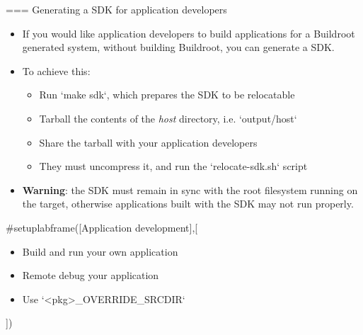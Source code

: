 === {Generating a SDK for application developers}
  \begin{itemize}
  \item If you would like application developers to build applications
    for a Buildroot generated system, without building Buildroot, you
    can generate a SDK.
  \item To achieve this:
    \begin{itemize}
    \item Run `make sdk`, which prepares the SDK to be
      relocatable
    \item Tarball the contents of the {\em host} directory, i.e.
      `output/host`
    \item Share the tarball with your application developers
    \item They must uncompress it, and run the `relocate-sdk.sh`
      script
    \end{itemize}
  \item {\bf Warning}: the SDK must remain in sync with the root
    filesystem running on the target, otherwise applications built
    with the SDK may not run properly.
  \end{itemize}


#setuplabframe([Application development],[
  \begin{itemize}
  \item Build and run your own application
  \item Remote debug your application
  \item Use `<pkg>_OVERRIDE_SRCDIR`
  \end{itemize}
])
